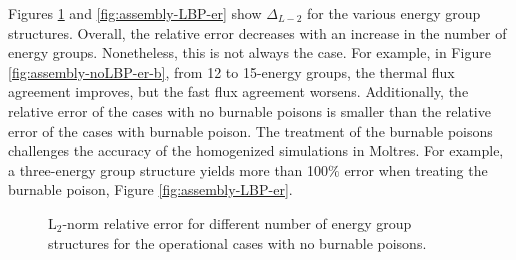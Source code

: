Figures \ref{fig:assembly-noLBP-er} and \ref{fig:assembly-LBP-er} show $\Delta_{L-2}$ for the various energy group structures.
Overall, the relative error decreases with an increase in the number of energy groups.
Nonetheless, this is not always the case.
For example, in Figure \ref{fig:assembly-noLBP-er-b}, from 12 to 15-energy groups, the thermal flux agreement improves, but the fast flux agreement worsens.
Additionally, the relative error of the cases with no burnable poisons is smaller than the relative error of the cases with burnable poison.
The treatment of the burnable poisons challenges the accuracy of the homogenized simulations in Moltres.
For example, a three-energy group structure yields more than 100$\%$ error when treating the burnable poison, Figure \ref{fig:assembly-LBP-er}.

\begin{figure}[htbp!]
	\centering
	\hfill
    \caption{L$_2$-norm relative error for different number of energy group structures for the operational cases with no burnable poisons.}
	\label{fig:assembly-noLBP-er}
\end{figure}

